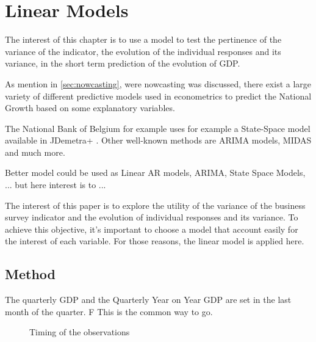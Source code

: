 \documentclass[12pt,a4paper,oneside]{book}
\newcommand{\ImageWidth}{11cm}
\begin{document}
\chapter{Linear Models}

The interest of this chapter is to use a model to test the pertinence of the variance of the indicator, the evolution of the individual responses and its variance, in the short term prediction of the evolution of GDP.

As mention in \autoref{sec:nowcasting}, were nowcasting was discussed, there exist a large variety of different predictive models used in econometrics to predict the National Growth based on some explanatory variables.

The National Bank of Belgium for example uses for example a State-Space model available in JDemetra+ \cite{de_antonio_liedo_nowcasting_2014}. Other well-known methods are ARIMA models, MIDAS and much more.

Better model could be used as Linear AR models, ARIMA, State Space Models, ... but here interest is to ...

The interest of this paper is to explore the utility of the variance of the business survey indicator and the evolution of individual responses and its variance. 
To achieve this objective, it's important to choose a model that account easily for the interest of each variable. For those reasons, the linear model is applied here.

\section{Method}

The quarterly GDP and the Quarterly Year on Year GDP are set in the last month of the quarter. F
This is the common way to go.

\begin{figure}[H]
    \centering
{}
    \caption{Timing of the observations}
    \label{fig:time of the data}
\end{figure}
\end{document}
